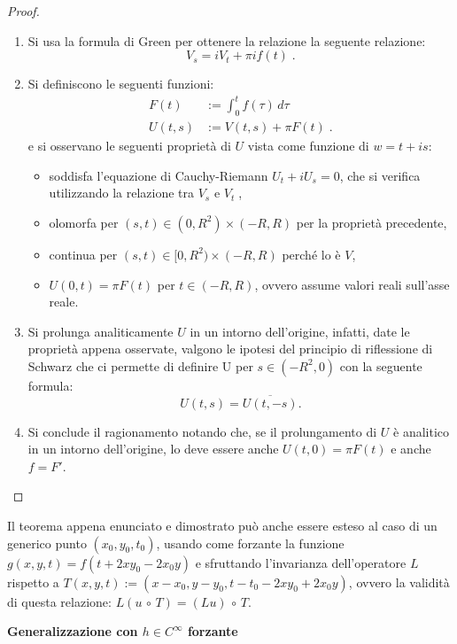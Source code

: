 \begin{example}
\begin{proof}
\begin{enumerate}[1.]
\item
Si usa la formula di Green per ottenere la relazione la seguente relazione:
\begin{equation*}
V_s = iV_t + \pi if(t)\;.
\end{equation*}
\item
Si definiscono le seguenti funzioni:
\begin{align*}
F(t)&:=\int_{0}^{t} f(\tau) \, d\tau\\
U(t,s)&:=V(t,s)+\pi F(t)\;.
\end{align*}
e si osservano le seguenti proprietà di $U$ vista come funzione di $w=t+is$: 
\begin{itemize}
\item
soddisfa l'equazione di Cauchy-Riemann $U_t+iU_s=0$, che si verifica utilizzando la relazione tra $V_s$ e $V_t\;$,
\item
olomorfa per $(s,t) \in (0,R^2) \times (-R,R)$ per la proprietà precedente,
\item
continua per $(s,t) \in [0,R^2) \times (-R,R)$ perché lo è $V$,
\item
$U(0,t)=\pi F(t)$ per $t\in (-R,R)$, ovvero assume valori reali sull'asse reale.
\end{itemize}
\item
Si prolunga analiticamente $U$ in un intorno dell'origine, infatti, 
date le proprietà appena osservate, valgono le ipotesi del principio di riflessione di Schwarz che ci permette 
di definire U per $s\in (-R^2,0)$ con la seguente formula: $$U(t,s)=\overline{U(t,-s)}.$$
\item
Si conclude il ragionamento notando che, se il prolungamento di $U$ è analitico in un intorno dell'origine, lo deve essere anche $U(t,0)=\pi F(t)$ e anche $f=F'$.
\end{enumerate}
\end{proof}

Il teorema appena enunciato e dimostrato può anche essere esteso al caso di un generico punto $(x_0,y_0,t_0)$, usando come forzante la funzione $g(x,y,t)=f(t+2xy_0-2x_0y)$ e sfruttando l'invarianza dell'operatore $L$ rispetto a 
$T(x,y,t):=(x-x_0,y-y_0,t-t_0-2xy_0+2x_0y)$, ovvero la validità di questa relazione: $L(u \,\circ\, T)=(Lu) \,\circ\, T$.

\textbf{Generalizzazione con $h \in C^\infty$ forzante}
\end{example}



